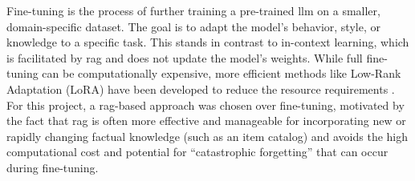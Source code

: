 Fine-tuning is the process of further training a pre-trained \ac{llm} on a smaller, domain-specific dataset. The goal is to adapt the model's behavior, style, or knowledge to a specific task. This stands in contrast to in-context learning, which is facilitated by \ac{rag} and does not update the model's weights. While full fine-tuning can be computationally expensive, more efficient methods like Low-Rank Adaptation (LoRA) have been developed to reduce the resource requirements \cite{LORA}. For this project, a \ac{rag}-based approach was chosen over fine-tuning, motivated by the fact that \ac{rag} is often more effective and manageable for incorporating new or rapidly changing factual knowledge (such as an item catalog) and avoids the high computational cost and potential for ``catastrophic forgetting'' that can occur during fine-tuning.